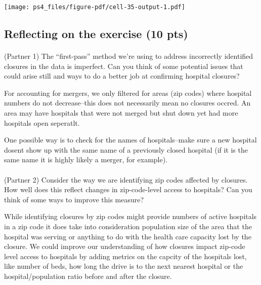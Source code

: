 \documentclass[
  letterpaper,
  DIV=11,
  numbers=noendperiod]{scrartcl}
\makeatletter
\let\oldparagraph\paragraph
\renewcommand{\paragraph}{
    \@ifstar
      \xxxParagraphStar
      \xxxParagraphNoStar
  }
\newcommand{\xxxParagraphStar}[1]{\oldparagraph*{#1}\mbox{}}
\newcommand{\xxxParagraphNoStar}[1]{\oldparagraph{#1}\mbox{}}
\makeatother
\begin{document}
\texttt{[image: ps4\_files/figure-pdf/cell-35-output-1.pdf]}

\subsection{Reflecting on the exercise (10
pts)}\label{reflecting-on-the-exercise-10-pts}

\paragraph{(Partner 1) The ``first-pass'' method we're using to address
incorrectly identified closures in the data is imperfect. Can you think
of some potential issues that could arise still and ways to do a better
job at confirming hospital
closures?}\label{partner-1-the-first-pass-method-were-using-to-address-incorrectly-identified-closures-in-the-data-is-imperfect.-can-you-think-of-some-potential-issues-that-could-arise-still-and-ways-to-do-a-better-job-at-confirming-hospital-closures}

For accounting for mergers, we only filtered for areas (zip codes) where
hospital numbers do not decrease--this does not necessarily mean no
closures occred. An area may have hospitals that were not merged but
shut down yet had more hospitals open seperatlt.

One possible way is to check for the names of hospitals--make sure a new
hospital dosent show up with the same name of a previously closed
hospital (if it is the same name it is highly likely a merger, for
example).

\paragraph{(Partner 2) Consider the way we are identifying zip codes
affected by closures. How well does this reflect changes in
zip-code-level access to hospitals? Can you think of some ways to
improve this
measure?}\label{partner-2-consider-the-way-we-are-identifying-zip-codes-affected-by-closures.-how-well-does-this-reflect-changes-in-zip-code-level-access-to-hospitals-can-you-think-of-some-ways-to-improve-this-measure}

While identifying closures by zip codes might provide numbers of active
hospitals in a zip code it does take into consideration population size
of the area that the hospital was serving or anything to do with the
health care capacity lost by the closure. We could improve our
understanding of how closures impact zip-code level access to hospitals
by adding metrics on the capcity of the hospitals lost, like number of
beds, how long the drive is to the next nearest hospital or the
hospital/population ratio before and after the closure.
\end{document}
